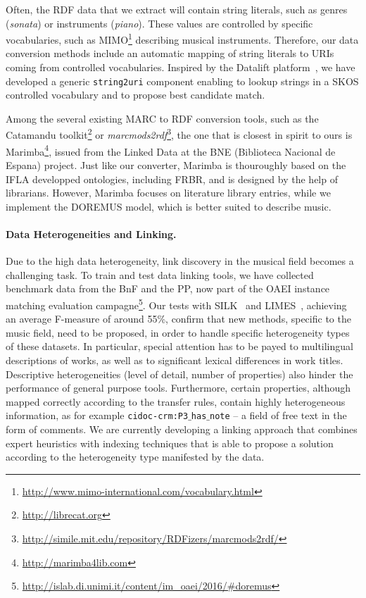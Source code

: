 \documentclass[runningheads,a4paper]{llncs}
\begin{document}
\vspace{-0.5cm}
Often, the RDF data that we extract will contain string literals, such as genres ({\it sonata}) or instruments ({\it piano}). These values are controlled by specific vocabularies, such as MIMO\footnote{\url{http://www.mimo-international.com/vocabulary.html}} describing musical instruments. Therefore, our data conversion methods include an automatic mapping of string literals to URIs coming from controlled vocabularies. Inspired by the Datalift platform~\cite{datalift}, we have developed a generic \texttt{string2uri} component enabling to lookup strings in a SKOS controlled vocabulary and to propose best candidate match.

Among the several existing MARC to RDF conversion tools, such as the Catamandu toolkit\footnote{\url{http://librecat.org}} or {\it marcmods2rdf}\footnote{\url{http://simile.mit.edu/repository/RDFizers/marcmods2rdf/}}, the one that is closest in spirit to ours is Marimba\footnote{\url{http://marimba4lib.com}}, issued from the Linked Data at the BNE (Biblioteca Nacional de Espana) project. Just like our converter, Marimba is thouroughly based on the IFLA developped ontologies, including FRBR, and is designed by the help of librarians. However, Marimba focuses on literature library entries, while we implement the DOREMUS model, which is better suited to describe music.

\paragraph{{\bf Data Heterogeneities and Linking.}} Due to the high data heterogeneity, link discovery in the musical field becomes a challenging task. To train and test data linking tools, we have collected benchmark data from the BnF and the PP, now part of the OAEI instance matching evaluation campagne\footnote{\url{http://islab.di.unimi.it/content/im_oaei/2016/\#doremus}}. Our tests with SILK~\cite{jentzsch2010silk} and LIMES~\cite{ngomo2011limes}, achieving an average F-measure of around 55\%, confirm that new methods, specific to the music field, need to be proposed, in order to handle specific heterogeneity types of these datasets. In particular, special attention has to be payed to multilingual descriptions of works, as well as to significant lexical differences in work titles. Descriptive heterogeneities (level of detail, number of properties) also hinder the performance of general purpose tools. Furthermore, certain properties, although mapped correctly according to the transfer rules, contain highly heterogeneous information, as for example \texttt{cidoc-crm:P3$\_$has$\_$note} -- a field of free text in the form of comments. We are currently developing a linking approach that combines expert heuristics with indexing techniques that is able to propose a solution according to the heterogeneity type manifested by the data.
\end{document}
